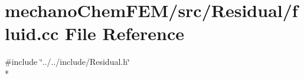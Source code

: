 \section{mechano\-Chem\-F\-E\-M/src/\-Residual/fluid.cc File Reference}
\label{fluid_8cc}
{\ttfamily \#include \char`\"{}../../include/\-Residual.\-h\char`\"{}}\\*
